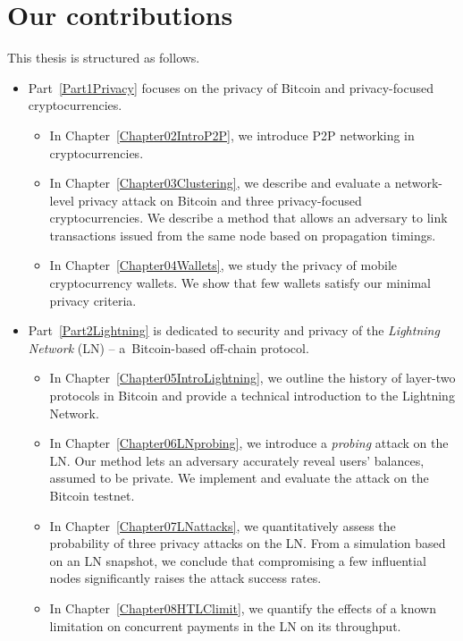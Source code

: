\section{Our contributions}

This thesis is structured as follows.

\begin{itemize}
	\item 
	Part~\ref{Part1Privacy} focuses on the privacy of Bitcoin and privacy-focused cryptocurrencies.
	\begin{itemize}
		\item
	In Chapter~\ref{Chapter02IntroP2P}, we introduce P2P networking in cryptocurrencies.
		\item
	In Chapter~\ref{Chapter03Clustering}, we describe and evaluate a network-level privacy attack on Bitcoin and three privacy-focused cryptocurrencies.
	We describe a method that allows an adversary to link transactions issued from the same node based on propagation timings.
		\item
	In Chapter~\ref{Chapter04Wallets}, we study the privacy of mobile cryptocurrency wallets.
	We show that few wallets satisfy our minimal privacy criteria.
	\end{itemize}

	\item
	Part~\ref{Part2Lightning} is dedicated to security and privacy of the \textit{Lightning Network} (LN) -- a~Bitcoin-based off-chain protocol.
	\begin{itemize}
		\item 
	In Chapter~\ref{Chapter05IntroLightning}, we outline the history of layer-two protocols in Bitcoin and provide a technical introduction to the Lightning Network.
		\item
	In Chapter~\ref{Chapter06LNprobing}, we introduce a \textit{probing} attack on the LN\@.
	Our method lets an adversary accurately reveal users' balances, assumed to be private.
	We implement and evaluate the attack on the Bitcoin testnet.
		\item
	In Chapter~\ref{Chapter07LNattacks}, we quantitatively assess the probability of three privacy attacks on the LN\@.
	From a simulation based on an LN snapshot, we conclude that compromising a few influential nodes significantly raises the attack success rates.
		\item
	In Chapter~\ref{Chapter08HTLClimit}, we quantify the effects of a known limitation on concurrent payments in the LN on its throughput.
	\end{itemize}


\end{itemize}

